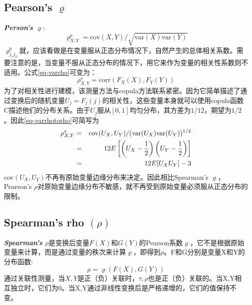 \subsection{Pearson's $\varrho$}
\emph{\textbf{\textcolor[rgb]{1,0,0}{Person's $\varrho$}}}:
\begin{equation}   
    \label{eq-varrho}
    \varrho^{p}_{X,Y} = \text{cov}(X,Y)/\sqrt{\text{var}(X)\text{var}(Y)}
\end{equation}
$\varrho_{j_1 j_2}^{p}$就，应该看做是在变量服从正态分布情况下，自然产生的总体相关系数。需要注意的是，当变量不服从正态分布的情况下，用它来作为变量的相关性系数则不适用\cite{Smith2009}。公式\ref{eq-varrho}可变为：
\begin{equation}
    \rho_{X,Y}^s = \text{corr}(F_{X}(X),F_{Y}(Y))
    \label{eq-varrhotorho}
\end{equation}
为了对相关性进行建模，该测量方法与copula方法联系紧密。因为它简单描述了通过变换后的随机变量$U_j = F_j(j)$的相关性，这些变量本身就可以使用copula函数C描述他们的分布关系。\textcolor[rgb]{1,0,0}{由于$U_j$服从$[0,1]$均匀分布}，其方差为$1/12$，期望为$1/2$。因此\cref{eq-varrhotorho}可简写为
\begin{eqnarray}
    \rho_{X,Y}^s &=& \text{cov}(U_{X},U_{Y})/(\text{var}(U_{X})\text{var}(U_{Y}))^{1/2} \notag \\
    &=& 12E \left[ \left(U_{X} - \dfrac{1}{2}\right)\left(U_{Y} - \dfrac{1}{2}\right) \right] \notag \\
    &=& 12E [U_{X}U_{Y}] -3
    \label{eq-rhoSimplified}
\end{eqnarray}
cov$(U_X,U_Y)$不再有原始变量边缘分布来决定。因此相比Spearman's $\varrho$，Pearson's $\rho$对原始变量边缘分布不敏感，就不再受到原始变量必须服从正态分布的限制。



\subsection{Spearman's rho $(\rho)$}
\emph{\textbf{\textcolor[rgb]{1,0,0}{Spearman's $\rho$}}}是变换后变量$F(X)$和$G(Y)$的Pearson系数$\varrho$\cite{Montes2015}，它不是根据原始变量来计算，而是通过变量的秩次来计算$\varrho$，即得到$\rho$。F和G分别是变量X和Y的分布函数:
\begin{equation}
    \label{eq-rho}
    \rho = \varrho(F(X),G(Y))
\end{equation}
通过关联性测量，当$X,Y$是正（负）关联时，$\tau,\rho$也是正（负）关联的。当X,Y相互独立时，它们为0。当X,Y通过非线性变换后是严格递增的，它们的值保持不变。

